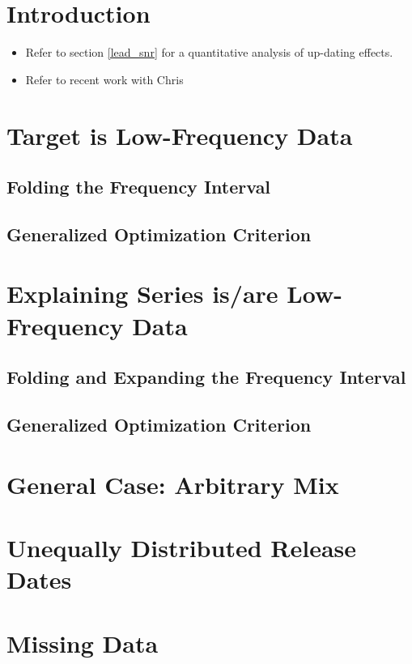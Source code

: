 \documentclass[a4paper]{book}
\begin{document}
\section{Introduction}

\begin{itemize}
\item Refer to section \ref{lead_snr} for a quantitative analysis of up-dating effects.
\item Refer to recent work with Chris
\end{itemize}


\section{Target is Low-Frequency Data}


\subsection{Folding the Frequency Interval}

\subsection{Generalized Optimization Criterion}

\section{Explaining Series is/are Low-Frequency Data}

\subsection{Folding and Expanding the Frequency Interval}

\subsection{Generalized Optimization Criterion}

\section{General Case: Arbitrary Mix}

\section{Unequally Distributed Release Dates}

\section{Missing Data}
\end{document}
